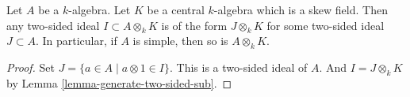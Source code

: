 \begin{lemma}
\label{lemma-generate-two-sided-ideal}
Let $A$ be a $k$-algebra. Let $K$ be a central $k$-algebra
which is a skew field. Then any two-sided ideal $I \subset A \otimes_k K$
is of the form $J \otimes_k K$ for some two-sided ideal $J \subset A$.
In particular, if $A$ is simple, then so is $A \otimes_k K$.
\end{lemma}

\begin{proof}
Set $J = \{a \in A \mid a \otimes 1 \in I\}$. This is a two-sided ideal
of $A$. And $I = J \otimes_k K$ by
Lemma \ref{lemma-generate-two-sided-sub}.
\end{proof}